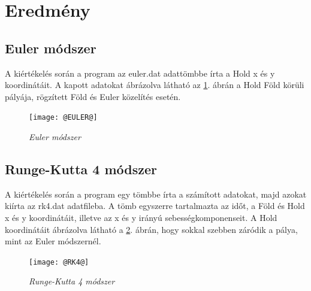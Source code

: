 \documentclass[a4paper, 12pt]{article}
\begin{document}
\section{Eredmény}
\label{sec:ered}

\subsection{Euler módszer}
\label{sebsec:euler_2}

A kiértékelés során a program az euler.dat adattömbbe írta a Hold x és y koordinátáit. A kapott adatokat ábrázolva látható az \ref{fig:euler}. ábrán a Hold Föld körüli pályája, rögzített Föld és Euler közelítés esetén.

\begin{figure}[h!]
\begin{center}
\texttt{[image: @EULER@]}
  \caption{\textit{Euler módszer}}
\label{fig:euler}
\end{center}
\end{figure}

\subsection{Runge-Kutta 4 módszer}
\label{subsec:rk4_2}
A kiértékelés során a program egy tömbbe írta a számított adatokat, majd azokat kiírta az rk4.dat adatfileba. A tömb egyszerre tartalmazta az időt, a Föld és Hold x és y koordinátáit, illetve az x és y irányú sebességkomponenseit. A Hold koordinátáit ábrázolva látható a \ref{fig:rk4}. ábrán, hogy sokkal szebben záródik a pálya, mint az Euler módszernél.

\begin{figure}[h!]
\begin{center}
\texttt{[image: @RK4@]}
  \caption{\textit{Runge-Kutta 4 módszer}}
\label{fig:rk4}
\end{center}
\end{figure}


\cleardoublepage
\vspace*{2cm}

\end{document}
